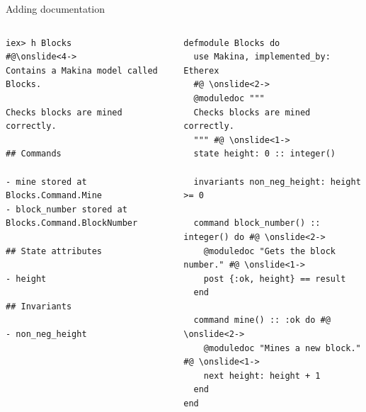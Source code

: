 \documentclass[aspectratio=169, 10pt, handout]{beamer}
\begin{document}
\begin{frame}[label={sec:org5758c4e},fragile]{Adding documentation}
 \begin{columns}
\begin{column}{0.48\columnwidth}
\lstset{language=bash,label= ,caption= ,captionpos=b,numbers=none,style=shell}
\begin{lstlisting}
iex> h Blocks
#@\onslide<4->
Contains a Makina model called Blocks.

Checks blocks are mined correctly.

## Commands

- mine stored at Blocks.Command.Mine
- block_number stored at Blocks.Command.BlockNumber

## State attributes

- height

## Invariants

- non_neg_height
\end{lstlisting}
\end{column}

\begin{column}{0.48\columnwidth}
\lstset{language=elixir,label= ,caption= ,captionpos=b,numbers=none,style=display}
\begin{lstlisting}
defmodule Blocks do
  use Makina, implemented_by: Etherex
  #@ \onslide<2->
  @moduledoc """
  Checks blocks are mined correctly.
  """ #@ \onslide<1->
  state height: 0 :: integer()

  invariants non_neg_height: height >= 0

  command block_number() :: integer() do #@ \onslide<2->
    @moduledoc "Gets the block number." #@ \onslide<1->
    post {:ok, height} == result
  end

  command mine() :: :ok do #@ \onslide<2->
    @moduledoc "Mines a new block." #@ \onslide<1->
    next height: height + 1
  end
end
\end{lstlisting}
\end{column}
\end{columns}
\end{frame}
\end{document}
